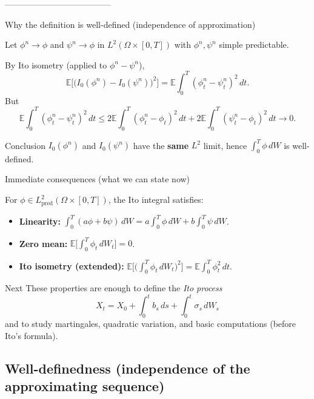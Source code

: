\documentclass[10pt,aspectratio=169]{beamer}
\newcommand{\E}{\mathbb{E}}
\begin{document}
--------------------------------------
\begin{frame}{Why the definition is well-defined (independence of approximation)}

Let $\phi^n\to\phi$ and $\psi^n\to\phi$ in $L^2(\Omega\times[0,T])$ with $\phi^n,\psi^n$ simple predictable.\pause

\medskip
By Ito isometry (applied to $\phi^n-\psi^n$),
\[
\E\Big[\big(I_0(\phi^n)-I_0(\psi^n)\big)^2\Big]
=
\E\int_0^T (\phi^n_t-\psi^n_t)^2\,dt.
\]
\pause
But
\[
\E\int_0^T (\phi^n_t-\psi^n_t)^2\,dt
\le
2\E\int_0^T (\phi^n_t-\phi_t)^2\,dt
+
2\E\int_0^T (\psi^n_t-\phi_t)^2\,dt
\to 0.
\]
\pause

\begin{block}{Conclusion}
$I_0(\phi^n)$ and $I_0(\psi^n)$ have the \textbf{same} $L^2$ limit, hence
$\int_0^T \phi\,dW$ is well-defined.
\end{block}

\end{frame}

\begin{frame}{Immediate consequences (what we can state now)}

For $\phi\in L^2_{\mathrm{pred}}(\Omega\times[0,T])$, the Ito integral satisfies:\pause
\begin{itemize}
  \item \textbf{Linearity:}\;
  $\int_0^T (a\phi+b\psi)\,dW = a\int_0^T \phi\,dW + b\int_0^T \psi\,dW$.\pause
  \item \textbf{Zero mean:}\;
  $\displaystyle \E\Big[\int_0^T \phi_t\,dW_t\Big]=0$.\pause
  \item \textbf{Ito isometry (extended):}\;
  $\displaystyle \E\Big[\Big(\int_0^T \phi_t\,dW_t\Big)^2\Big]
  =
  \E\int_0^T \phi_t^2\,dt$.\pause
\end{itemize}

\medskip
\begin{alertblock}{Next}
These properties are enough to define the \emph{Ito process}
\[
X_t = X_0 + \int_0^t b_s\,ds + \int_0^t \sigma_s\,dW_s
\]
and to study martingales, quadratic variation, and basic computations (before Ito's formula).
\end{alertblock}

\end{frame}

\subsection{Well-definedness (independence of the approximating sequence)}
\end{document}
